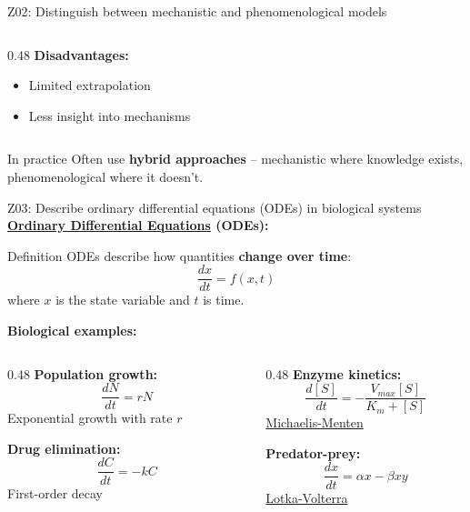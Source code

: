 \documentclass[aspectratio=169, 10pt]{beamer}
\begin{document}
\begin{frame}{Z02: Distinguish between mechanistic and phenomenological models}
\begin{columns}[T]
\begin{column}{0.48\textwidth}
            \textbf{Disadvantages:}
            \begin{itemize}
                \item Limited extrapolation
                \item Less insight into mechanisms
            \end{itemize}
        \end{column}
    \end{columns}
    
    \vspace{0.3cm}
    \begin{block}{In practice}
        Often use \textbf{hybrid approaches} -- mechanistic where knowledge exists, phenomenological where it doesn't.
    \end{block}
\end{frame}

\begin{frame}{Z03: Describe ordinary differential equations (ODEs) in biological systems}
    \textbf{\href{https://en.wikipedia.org/wiki/Ordinary_differential_equation}{Ordinary Differential Equations} (ODEs):}
    
    \begin{block}{Definition}
        ODEs describe how quantities \textbf{change over time}:
        \[
        \frac{dx}{dt} = f(x, t)
        \]
        where $x$ is the state variable and $t$ is time.
    \end{block}
    
    \vspace{0.2cm}
    \textbf{Biological examples:}
    \begin{columns}[T]
        \begin{column}{0.48\textwidth}
            \textbf{Population growth:}
            \[
            \frac{dN}{dt} = rN
            \]
            Exponential growth with rate $r$
            
            \vspace{0.2cm}
            \textbf{Drug elimination:}
            \[
            \frac{dC}{dt} = -kC
            \]
            First-order decay
        \end{column}
        \begin{column}{0.48\textwidth}
            \textbf{Enzyme kinetics:}
            \[
            \frac{d[S]}{dt} = -\frac{V_{max}[S]}{K_m + [S]}
            \]
            \href{https://en.wikipedia.org/wiki/Michaelis\%E2\%80\%93Menten_kinetics}{Michaelis-Menten}
            
            \vspace{0.2cm}
            \textbf{Predator-prey:}
            \[
            \frac{dx}{dt} = \alpha x - \beta xy
            \]
            \href{https://en.wikipedia.org/wiki/Lotka\%E2\%80\%93Volterra_equations}{Lotka-Volterra}
        \end{column}
    \end{columns}
\end{frame}
\end{document}
